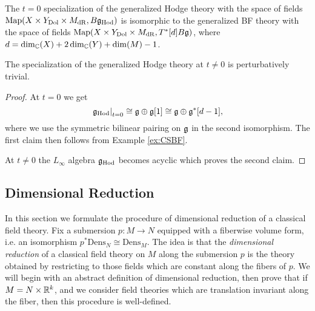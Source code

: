 \documentclass[10pt, oneside]{article}
\newcommand{\Dens}{\mathrm{Dens}}
\newcommand{\Hod}{\mathrm{Hod}}
\begin{document}
\begin{prop}
The $t=0$ specialization of the generalized Hodge theory with the space of fields $\map(X\times Y_{\mr{Dol}}\times M_{\mr{dR}}, B \fg_\Hod)$ is isomorphic to the generalized BF theory with the space of fields $\operatorname{Map}(X\times Y_{\mathrm{Dol}}\times M_{\mathrm{dR}}, T^*[d] B \mathfrak g)$, where $d = \dim_\mathbb C(X) + 2\dim_\mathbb C(Y) + \dim(M) - 1$.

The specialization of the generalized Hodge theory at $t\neq 0$ is perturbatively trivial.
\label{prop:Hodgetheoryspecialization}
\end{prop}

\begin{proof}
At $t=0$ we get
\[\left.\fg_\Hod\right|_{t=0}\cong \fg\oplus \fg[1]\cong \fg\oplus \fg^*[d-1],\]
where we use the symmetric bilinear pairing on $\mathfrak g$ in the second isomorphism. The first claim then follows from Example \ref{ex:CSBF}.

At $t\neq 0$ the $L_\infty$ algebra $\fg_\Hod$ becomes acyclic which proves the second claim.
\end{proof}


\subsection{Dimensional Reduction} \label{dim_red_section}

In this section we formulate the procedure of dimensional reduction of a classical field theory. Fix a submersion $p\colon M\rightarrow N$ equipped with a fiberwise volume form, i.e. an isomorphism $p^*\Dens_N\cong \Dens_M$.  The idea is that the \emph{dimensional reduction} of a classical field theory on $M$ along the submersion $p$ is the theory obtained by restricting to those fields which are constant along the fibers of $p$.  We will begin with an abstract definition of dimensional reduction, then prove that if $M = N \times \mathbb R^k$, and we consider field theories which are translation invariant along the fiber, then this procedure is well-defined.
\end{document}
